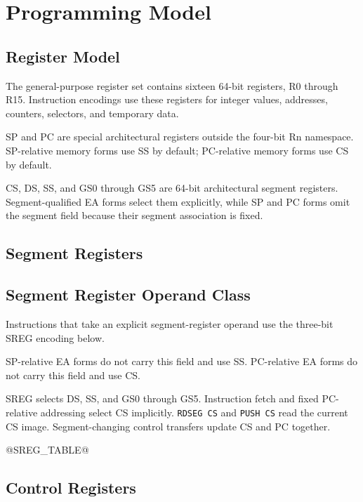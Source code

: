 \clearpage
\section{Programming Model}\label{page:programming-model}

\subsection{Register Model}\label{section:register-model}
The general-purpose register set contains sixteen 64-bit registers, R0 through R15. Instruction encodings use these
registers for integer values, addresses, counters, selectors, and temporary data.

SP and PC are special architectural registers outside the four-bit Rn namespace. SP-relative memory forms use SS by
default; PC-relative memory forms use CS by default.

CS, DS, SS, and GS0 through GS5 are 64-bit architectural segment registers. Segment-qualified EA forms select them
explicitly, while SP and PC forms omit the segment field because their segment association is fixed.





\subsection{Segment Registers}\label{section:segment-registers}


\subsection{Segment Register Operand Class}
Instructions that take an explicit segment-register operand use the three-bit SREG encoding below.

SP-relative EA forms do not carry this field and use SS. PC-relative EA forms do not carry this field and use CS.

SREG selects DS, SS, and GS0 through GS5. Instruction fetch and fixed PC-relative addressing select CS implicitly.
\texttt{RDSEG CS} and \texttt{PUSH CS} read the current CS image. Segment-changing control transfers update CS and
PC together.

@SREG_TABLE@
\label{table:sreg-encoding}

\subsection{Control Registers}\label{section:control-registers}


